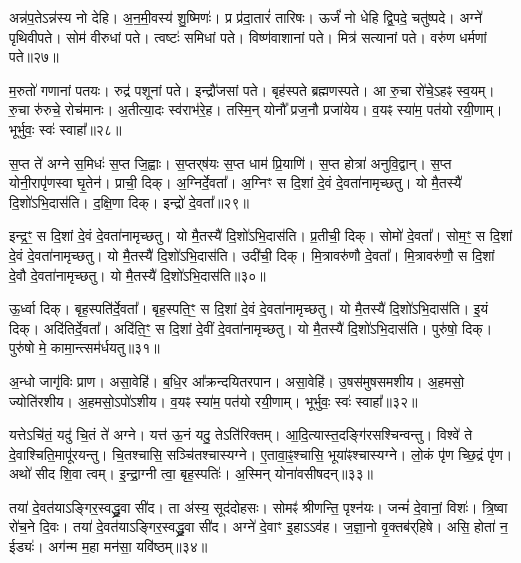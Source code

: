    अन्न॑प॒तेऽन्न॑स्य नो देहि।
   अ॒न॒मी॒वस्य॑ शु॒ष्मिणः॑।
   प्र प्र॑दा॒तारं॑ तारिषः।
   ऊर्जं॑ नो धेहि द्वि॒पदे॒ चतु॑ष्पदे।
   अग्ने॑ पृथिवीपते।
   सोम॑ वीरुधां पते।
   त्वष्टः॑ समिधां पते।
   विष्ण॑वाशानां पते।
   मित्र॑ सत्यानां पते।
   वरु॑ण धर्मणां पते॥२७॥

   म॒रुतो॑  गणानां पतयः।
   रुद्र॑ पशूनां पते।
   इन्द्रौ॑जसां पते।
   बृह॑स्पते ब्रह्मणस्पते।
   आ रु॒चा रो॑चे॒ऽहꣴ स्व॒यम्।
   रु॒चा रु॑रुचे॒ रोच॑मानः।
   अ॒तीत्या॒दः स्व॑राभ॑रे॒ह।
   तस्मि॒न् योनौ᳚ प्रज॒नौ प्रजा॑येय।
   व॒यꣴ स्या॑म॒ पत॑यो रयी॒णाम्।
   भूर्भुवः॒ स्वः॑ स्वाहा᳚॥२८॥
  \anuvakamend
  
    स॒प्त ते॑ अग्ने स॒मिधः॑ स॒प्त जि॒ह्वाः।
   स॒प्तर्{‌}ष॑यः स॒प्त धाम॑ प्रि॒याणि॑।
   स॒प्त होत्रा॑ अनुवि॒द्वान्।
   स॒प्त योनी॒रापृ॑णस्वा घृ॒तेन॑।
   प्राची॒ दिक्।
   अ॒ग्निर्दे॒वता᳚।
   अ॒ग्निꣳ स दि॒शां दे॒वं दे॒वता॑नामृच्छतु।
   यो मै॒तस्यै॑ दि॒शो॑ऽभि॒दास॑ति।
   द॒क्षि॒णा दिक्।
   इन्द्रो॑ दे॒वता᳚॥२९॥

   इन्द्र॒ꣳ॒ स दि॒शां दे॒वं दे॒वता॑नामृच्छतु।
   यो मै॒तस्यै॑ दि॒शो॑ऽभि॒दास॑ति।
   प्र॒तीची॒ दिक्।
   सोमो॑ दे॒वता᳚।
   सोम॒ꣳ॒ स दि॒शां दे॒वं दे॒वता॑नामृच्छतु।
   यो मै॒तस्यै॑ दि॒शो॑ऽभि॒दास॑ति।
   उदी॑ची॒ दिक्।
   मि॒त्रावरु॑णौ दे॒वता᳚।
   मि॒त्रावरु॑णौ॒ स दि॒शां दे॒वौ दे॒वता॑नामृच्छतु।
   यो मै॒तस्यै॑ दि॒शो॑ऽभि॒दास॑ति॥३०॥

   ऊ॒र्ध्वा दिक्।
   बृह॒स्पति॑र्दे॒वता᳚।
   बृह॒स्पति॒ꣳ॒ स दि॒शां दे॒वं दे॒वता॑नामृच्छतु।
   यो मै॒तस्यै॑ दि॒शो॑ऽभि॒दास॑ति।
   इ॒यं दिक्।
   अदि॑तिर्दे॒वता᳚।
   अदि॑ति॒ꣳ॒ स दि॒शां दे॒वीं दे॒वता॑नामृच्छतु।
   यो मै॒तस्यै॑ दि॒शो॑ऽभि॒दास॑ति।
   पुरु॑षो॒ दिक्।
   पुरु॑षो मे॒ कामा॒न्त्सम॑र्धयतु॥३१॥
   
   अ॒न्धो जागृ॑विः प्राण।
   असा॒वेहि॑।
   ब॒धि॒र आ᳚क्रन्दयितरपान।
   असा॒वेहि॑।
   उ॒षस॑मुषसमशीय।
   अ॒हमसो॒ ज्योति॑रशीय।
   अ॒हमसो॒ऽपो॑ऽशीय।
   व॒यꣴ स्या॑म॒ पत॑यो रयी॒णाम्।
   भूर्भुवः॒ स्वः॑ स्वाहा᳚॥३२॥
\anuvakamend
  
   यत्तेऽचि॑तं॒ यदु॑ चि॒तं ते॑ अग्ने।
   यत्त॑ ऊ॒नं यदु॒ तेऽति॑रिक्तम्।
   आ॒दि॒त्यास्त॒दङ्गि॑रसश्चिन्वन्तु।
   विश्वे॑ ते दे॒वाश्चिति॒मापू॑रयन्तु।
   चि॒तश्चासि॒ सञ्चि॑तश्चास्यग्ने।
   ए॒तावा॒ꣴ॒श्चासि॒ भूया॑ꣴश्चास्यग्ने।
   लो॒कं पृ॑ण च्छि॒द्रं पृ॑ण।
   अथो॑ सीद शि॒वा त्वम्।
   इ॒न्द्रा॒ग्नी त्वा॒ बृह॒स्पतिः॑।
   अ॒स्मिन् योना॑वसीषदन्॥३३॥

   तया॑ दे॒वत॑याऽङ्गिर॒स्वद्ध्रु॒वा सी॑द।
   ता अ॑स्य॒ सूद॑दोहसः।
   सोमꣴ॑ श्रीणन्ति॒ पृश्न॑यः।
   जन्मं॑ दे॒वानां॒ विशः॑।
   त्रि॒ष्वा रो॑च॒ने दि॒वः।
   तया॑ दे॒वत॑याऽङ्गिर॒स्वद्ध्रु॒वा सी॑द।
   अग्ने॑ दे॒वाꣳ इ॒हाऽऽव॑ह।
   ज॒ज्ञा॒नो वृ॒क्तब॑र्{‌}हिषे।
   असि॒ होता॑ न॒ ईड्यः॑।
   अग॑न्म म॒हा मन॑सा॒ यवि॑ष्ठम्॥३४॥

